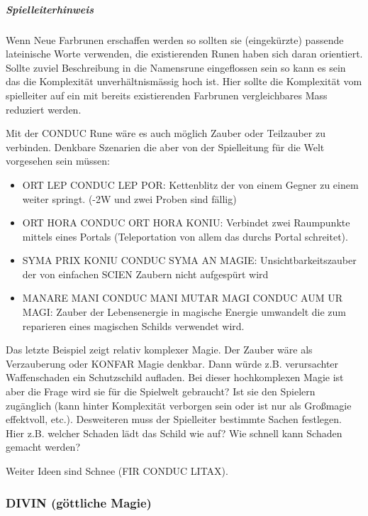 \documentclass{article}
\begin{document}
\begin{mdframed}[hidealllines=true, backgroundcolor=black!10]
\subparagraph{Spielleiterhinweis}

Wenn Neue Farbrunen erschaffen werden so sollten sie (eingekürzte) passende lateinische Worte verwenden, die 
existierenden Runen haben sich daran orientiert. Sollte zuviel Beschreibung in die Namensrune eingeflossen sein
so kann es sein das die Komplexität unverhältnismässig hoch ist. Hier sollte die Komplexität vom spielleiter auf
ein mit bereits existierenden Farbrunen vergleichbares Mass reduziert werden.

Mit der CONDUC Rune wäre es auch möglich Zauber oder Teilzauber zu verbinden. Denkbare Szenarien die aber von der
Spielleitung für die Welt vorgesehen sein müssen:

\begin{itemize}
\item ORT LEP CONDUC LEP POR: Kettenblitz der von einem Gegner zu einem weiter springt. (-2W und zwei Proben sind fällig)
\item ORT HORA CONDUC ORT HORA KONIU: Verbindet zwei Raumpunkte mittels eines Portals (Teleportation von allem das durchs Portal schreitet).
\item SYMA PRIX KONIU CONDUC SYMA AN MAGIE: Unsichtbarkeitszauber der von einfachen SCIEN Zaubern nicht aufgespürt wird
\item MANARE MANI CONDUC MANI MUTAR MAGI CONDUC AUM UR MAGI: Zauber der Lebensenergie in magische Energie umwandelt die zum reparieren eines magischen Schilds verwendet wird.
\end{itemize}

Das letzte Beispiel zeigt relativ komplexer Magie. Der Zauber wäre als Verzauberung oder KONFAR Magie denkbar. Dann
würde z.B. verursachter Waffenschaden ein Schutzschild aufladen. Bei dieser hochkomplexen Magie ist aber die Frage
wird sie für die Spielwelt gebraucht? Ist sie den Spielern zugänglich (kann hinter Komplexität verborgen sein oder
ist nur als Großmagie effektvoll, etc.). Desweiteren muss der Spielleiter bestimmte Sachen festlegen. Hier z.B.
welcher Schaden lädt das Schild wie auf? Wie schnell kann Schaden gemacht werden?

Weiter Ideen sind Schnee (FIR CONDUC LITAX).

\end{mdframed}
\subsubsection{DIVIN (göttliche Magie)}
\end{document}
